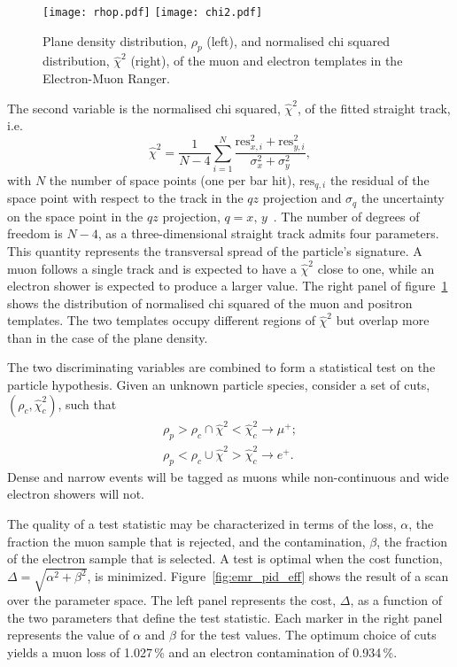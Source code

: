 \begin{figure}[htb!]
	\begin{center}
		\texttt{[image: rhop.pdf]}
		\hfill
		\texttt{[image: chi2.pdf]}
		\caption{Plane density distribution, $\rho_p$ (left), and normalised chi squared distribution, $\hat{\chi}^2$ (right), of the muon and electron templates in the Electron-Muon Ranger.}
		\label{fig:emr_pid_variables}
	\end{center}
\end{figure}

The second variable is the normalised chi squared, $\hat{\chi}^2$, of the fitted straight track, i.e.
\begin{equation}
\hat{\chi}^2=\frac{1}{N-4}\sum_{i=1}^{N}\frac{\text{res}_{x,i}^2+\text{res}_{y,i}^2}{\sigma_x^2+\sigma_y^2},
\end{equation}
with $N$ the number of space points (one per bar hit), $\text{res}_{q,i}$ the residual of the space point with respect to the track in the $qz$ projection and $\sigma_q$ the uncertainty on the space point in the $qz$ projection, $q=x,\,y$~\cite{Drielsma:thesis}. The number of degrees of freedom is $N-4$, as a three-dimensional straight track admits four parameters. This quantity represents the transversal spread of the particle's signature. A muon follows a single track and is expected to have a $\hat{\chi}^2$ close to one, while an electron shower is expected to produce a larger value. The right panel of figure~\ref{fig:emr_pid_variables} shows the distribution of normalised chi squared of the muon and positron templates. The two templates occupy different regions of $\hat{\chi}^2$ but overlap more than in the case of the plane density.

The two discriminating variables are combined to form a statistical test on the particle hypothesis. Given an unknown particle species, consider a set of cuts, $(\rho_c,\hat{\chi}^2_c)$, such that
\begin{equation}
\begin{gathered}
\rho_p>\rho_c \cap \hat{\chi}^2<\hat{\chi}^2_c  \rightarrow  \mu^+; \\
\rho_p<\rho_c \cup \hat{\chi}^2>\hat{\chi}^2_c \rightarrow  e^+.
\end{gathered}
\end{equation}
Dense and narrow events will be tagged as muons while non-continuous and wide electron showers will not. 

The quality of a test statistic may be characterized in terms of the loss, $\alpha$, the fraction the muon sample that is rejected, and the contamination, $\beta$, the fraction of the electron sample that is selected. A test is optimal when the cost function, $\Delta=\sqrt{\alpha^2+\beta^2}$, is minimized. Figure~\ref{fig:emr_pid_eff} shows the result of a scan over the parameter space. The left panel represents the cost, $\Delta$, as a function of the two parameters that define the test statistic. Each marker in the right panel represents the value of $\alpha$ and $\beta$ for the test values. The optimum choice of cuts yields a muon loss of 1.027\,\% and an electron contamination of 0.934\,\%.

